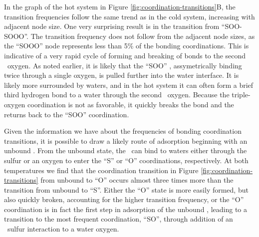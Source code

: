 In the graph of the hot system in Figure \ref{fig:coordination-transitions}B, the transition frequencies follow the same trend as in the cold system, increasing with adjacent node size. One very surprising result is in the transition from ``SOO-SOOO''. The transition frequency does not follow from the adjacent node sizes, as the ``SOOO'' node represents less than 5\% of the bonding coordinations. This is indicative of a very rapid cycle of forming and breaking of bonds to the second \suldiox~oxygen. As noted earlier, it is likely that the ``SOO'' \suldiox, assymetrically binding twice through a single oxygen, is pulled further into the water interface. It is likely more surrounded by waters, and in the hot system it can often form a brief third hydrogen bond to a water through the second \suldiox~oxygen. Because the triple-oxygen coordination is not as favorable, it quickly breaks the bond and the \suldiox returns back to the ``SOO'' coordination.

Given the information we have about the frequencies of bonding coordination transitions, it is possible to draw a likely route of adsorption beginning with an unbound \suldiox. From the unbound state, the \suldiox~can bind to waters either through the sulfur or an oxygen to enter the ``S'' or ``O'' coordinations, respectively. At both temperatures we find that the coordination transition in Figure \ref{fig:coordination-transitions} from unbound to ``O'' occurs almost three times more than the transition from unbound to ``S''. Either the ``O'' state is more easily formed, but also quickly broken, accounting for the higher transition frequency, or the ``O'' coordination is in fact the first step in adsorption of the unbound \suldiox, leading to a transition to the most frequent coordination, ``SO'', through addition of an \suldiox~sulfur interaction to a water oxygen.

